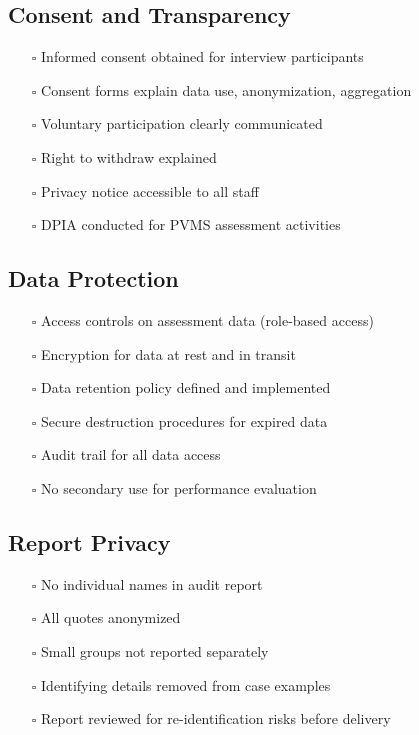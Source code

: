 \documentclass[11pt,a4paper]{article}
\begin{document}
\subsection{Consent and Transparency}

\begin{itemize}
\item[$\square$] Informed consent obtained for interview participants
\item[$\square$] Consent forms explain data use, anonymization, aggregation
\item[$\square$] Voluntary participation clearly communicated
\item[$\square$] Right to withdraw explained
\item[$\square$] Privacy notice accessible to all staff
\item[$\square$] DPIA conducted for PVMS assessment activities
\end{itemize}

\subsection{Data Protection}

\begin{itemize}
\item[$\square$] Access controls on assessment data (role-based access)
\item[$\square$] Encryption for data at rest and in transit
\item[$\square$] Data retention policy defined and implemented
\item[$\square$] Secure destruction procedures for expired data
\item[$\square$] Audit trail for all data access
\item[$\square$] No secondary use for performance evaluation
\end{itemize}

\subsection{Report Privacy}

\begin{itemize}
\item[$\square$] No individual names in audit report
\item[$\square$] All quotes anonymized
\item[$\square$] Small groups not reported separately
\item[$\square$] Identifying details removed from case examples
\item[$\square$] Report reviewed for re-identification risks before delivery
\end{itemize}
\end{document}
